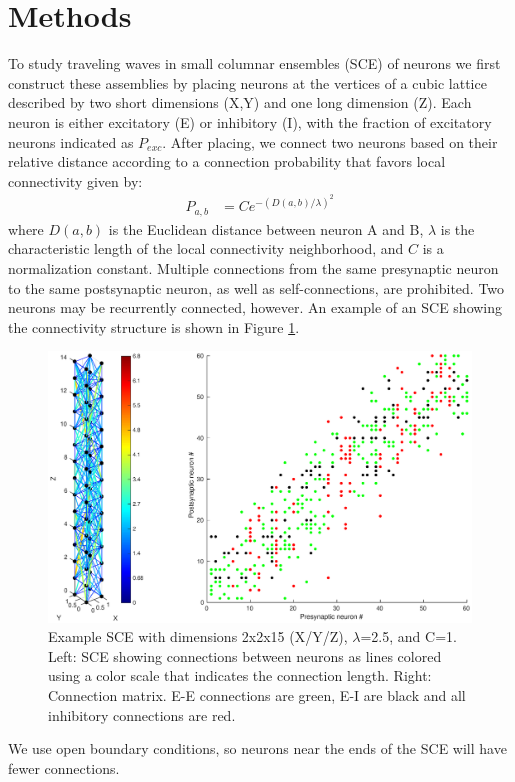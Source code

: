 \documentclass[12pt]{article}
\begin{document}
\section{Methods}
To study traveling waves in small columnar ensembles (SCE) of neurons we first construct these assemblies by placing neurons at the vertices of a cubic lattice described by two short \color{red} dimensions (X,Y) and one long dimension (Z)\color{black}. 
Each neuron is either excitatory (E) or inhibitory (I), with the fraction of excitatory neurons indicated as $P_{exc}$.
After placing, we connect two neurons based on their relative distance according to a connection probability that favors local connectivity given by: 
\begin{align}\label{eq:connectivity}
 P_{a,b} &= C e^{-(D(a,b)/\lambda)^2}
\end{align}
where $D(a,b)$ is the Euclidean distance between neuron A and B, $\lambda$ is the characteristic length of the local connectivity neighborhood, and $C$ is a normalization constant.
\color{red}Multiple connections from the same presynaptic neuron to the same postsynaptic neuron, as well as self-connections, are prohibited.
Two neurons may be recurrently connected, however.\color{black}
An example of an SCE showing the connectivity structure is shown in Figure \ref{fig:column_structure}.
\begin{figure}[!htb]
 \caption{Example SCE with dimensions 2x2x15 \color{red}(X/Y/Z)\color{black}, $\lambda$=2.5, and C=1. Left: SCE showing connections between neurons as lines colored using a color scale that indicates the connection length. Right: Connection matrix. E-E connections are green, E-I are black and all inhibitory connections are red. }
 \label{fig:column_structure}
 \centering
   \includegraphics[width=\textwidth]{fig/column_structure}
\end{figure}
\color{red}We use open boundary conditions, so neurons near the ends of the SCE will have fewer connections.\color{black}
\end{document}
